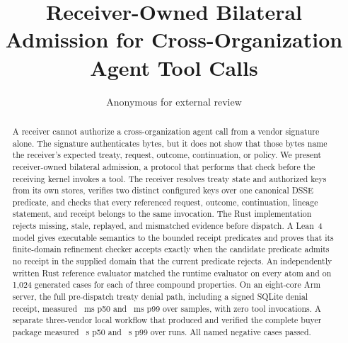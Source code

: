 \documentclass[sigconf,anonymous,review,nonacm]{acmart}
\title{Receiver-Owned Bilateral Admission for Cross-Organization Agent Tool Calls}
\author{Anonymous for external review}
\affiliation{\institution{Anonymous Institution}}
\begin{document}
\begin{abstract}
A receiver cannot authorize a cross-organization agent call from a vendor
signature alone. The signature authenticates bytes, but it does not show that
those bytes name the receiver's expected treaty, request, outcome,
continuation, or policy. We
present receiver-owned bilateral admission, a protocol that performs that
check before the receiving kernel invokes a tool. The receiver resolves treaty
state and authorized keys from its own stores, verifies two distinct
configured keys over one canonical DSSE predicate, and checks that every
referenced request, outcome, continuation, lineage statement, and receipt
belongs to the same invocation. The Rust implementation rejects missing,
stale, replayed, and mismatched evidence before dispatch. A Lean~4 model gives
executable semantics to the bounded receipt predicates and proves that its
finite-domain refinement checker accepts exactly when the candidate predicate
admits no receipt in the supplied domain that the current predicate rejects. An
independently written Rust reference evaluator matched the runtime
evaluator on every atom and on 1,024 generated cases for each of three
compound properties. On an eight-core Arm server, the full pre-dispatch treaty
denial path, including a signed SQLite denial receipt, measured
\PSPredispatchDenyPFiftyMs~ms p50 and
\PSPredispatchDenyPNinetyNineMs~ms p99 over
\PSCriterionSampleCount{} samples, with zero tool invocations. A separate
three-vendor local workflow that produced and verified the complete buyer
package measured \PSBuyerWorkflowPFiftySec~s p50 and
\PSBuyerWorkflowPNinetyNineSec~s p99 over \PSPathSampleCount{} runs. All
\PSThreatCaseCount{} named negative cases passed.
\end{abstract}

\maketitle














\end{document}
